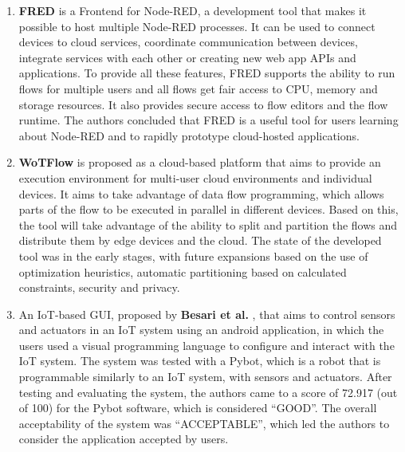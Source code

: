 \begin{enumerate}
    \item \textbf{FRED} \cite{fred} is a Frontend for Node-RED, a development tool that makes it possible to host multiple Node-RED processes. It can be used to connect devices to cloud services, coordinate communication between devices, integrate services with each other or creating new web app APIs and applications. To provide all these features, FRED supports the ability to run flows for multiple users and all flows get fair access to CPU, memory and storage resources. It also provides secure access to flow editors and the flow runtime. The authors concluded that FRED is a useful tool for users learning about Node-RED and to rapidly prototype cloud-hosted applications.
    \item \textbf{WoTFlow} \cite{wotflow_dnr} is proposed as a cloud-based platform that aims to provide an execution environment for multi-user cloud environments and individual devices. It aims to take advantage of data flow programming, which allows parts of the flow to be executed in parallel in different devices. Based on this, the tool will take advantage of the ability to split and partition the flows and distribute them by edge devices and the cloud. The state of the developed tool was in the early stages, with future expansions based on the use of optimization heuristics, automatic partitioning based on calculated constraints, security and privacy.
    \item An IoT-based GUI, proposed by \textbf{Besari et al.} \cite{mobile_apps_rpi} \cite{pre_mobile_apps_rpi}, that aims to control sensors and actuators in an IoT system using an android application, in which the users used a visual programming language to configure and interact with the IoT system. The system was tested with a Pybot, which is a robot that is programmable similarly to an IoT system, with sensors and actuators. After testing and evaluating the system, the authors came to a score of 72.917 (out of 100) for the Pybot software, which is considered “GOOD”. The overall acceptability of the system was “ACCEPTABLE”, which led the authors to consider the application accepted by users.

\end{enumerate}
